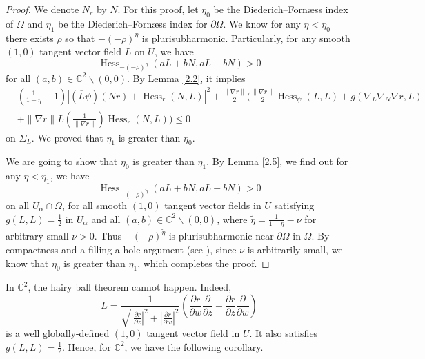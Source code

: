 \documentclass[11pt]{article}
\theoremstyle{plain} \numberwithin{equation}{section}
\theoremstyle{definition}
\DeclareMathOperator{\Hessian}{Hess}
\begin{document}
\begin{proof}
	We denote $N_r$ by $N$. For this proof, let $\eta_0$ be the Diederich--Forn\ae ss index of $\Omega$ and $\eta_1$ be the Diederich--Forn\ae ss index for $\partial\Omega$. We know for any $\eta<\eta_0$ there exists $\rho$ so that $-(-\rho)^\eta$ is plurisubharmonic. Particularly, for any smooth $(1,0)$ tangent vector field $L$ on $U$, we have \[\Hessian_{-(-\rho)^\eta}(aL+bN, aL+bN)>0\] for all $(a,b)\in\mathbb{C}^2\backslash(0,0)$. By Lemma \ref{2.2}, it implies\[\begin{split}
	&\left(\frac{1}{1-\eta}-1\right)\left|(\overline{L}\psi)(Nr)+\Hessian_r(N, L)\right|^2+\frac{\|\nabla r\|}{2}\Bigg(\frac{\|\nabla r\|}{2}\Hessian_\psi(L, L)+g(\nabla_L\nabla_N\nabla r, L)\\&+\|\nabla r\|L\left(\frac{1}{\|\nabla r\|}\right)\Hessian_r(N, L)\Bigg)\leq 0\end{split}
	\] on $\Sigma_L$. We proved that $\eta_1$ is greater than $\eta_0$. 
	
	We are going to show that $\eta_0$ is greater than $\eta_1$. By Lemma \ref{2.5}, we find out for any $\eta<\eta_1$, we have \[\Hessian_{-(-\rho)^{\tilde{\eta}}}(aL+bN,aL+bN)>0\] on all $U_\alpha\cap\Omega$, for all smooth $(1, 0)$ tangent vector fields in $U$ satisfying $g(L, L)=\frac{1}{2}$ in $U_\alpha$ and all $(a,b)\in\mathbb{C}^2\backslash(0,0)$, where $\tilde{\eta}=\frac{1}{1-\eta}-\nu$ for arbitrary small $\nu>0$. Thus $-(-\rho)^{\tilde{\eta}}$ is plurisubharmonic near $\partial\Omega$ in $\Omega$. By compactness and a filling a hole argument (see \citep{DF77b}), since $\nu$ is arbitrarily small, we know that $\eta_0$ is greater than $\eta_1$, which completes the proof.
\end{proof}



In $\mathbb{C}^2$, the hairy ball theorem cannot happen. Indeed,  \[L=\frac{1}{\sqrt{|\frac{\partial r}{\partial z}|^2+|\frac{\partial r}{\partial w}|^2}}(\frac{\partial r}{\partial w}\frac{\partial}{\partial z}-\frac{\partial r}{\partial z}\frac{\partial}{\partial w})\] is a well globally-defined $(1,0)$ tangent vector field in $U$. It also satisfies $g(L, L)=\frac{1}{2}$. Hence, for $\mathbb{C}^2$, we have the following corollary.
\end{document}
